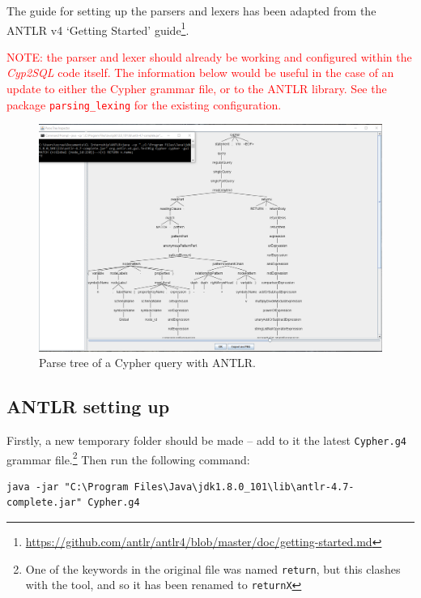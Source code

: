 \documentclass[letterpaper]{ltxdoc}
\begin{document}
The guide for setting up the parsers and lexers has been adapted from the ANTLR v4 `Getting Started' guide\footnote{\url{https://github.com/antlr/antlr4/blob/master/doc/getting-started.md}}.

\medskip

\textcolor{red}{NOTE: the parser and lexer should already be working and configured within the \emph{Cyp2SQL} code itself. The information below would be useful in the case of an update to either the Cypher grammar file, or to the ANTLR library. See the package \texttt{parsing\_lexing} for the existing configuration.}

\begin{figure}[h]
\centerline{\includegraphics[width=\textwidth,height=\textheight,keepaspectratio]{ss3.png}}
\caption{Parse tree of a Cypher query with ANTLR.}
\label{antlrs}
\end{figure}

\subsection{ANTLR setting up}

Firstly, a new temporary folder should be made -- add to it the latest \texttt{Cypher.g4} grammar file.\footnote{One of the keywords in the original file was named \texttt{return}, but this clashes with the tool, and so it has been renamed to \texttt{returnX}} Then run the following command:

\begin{lstlisting}[style=DOS]
java -jar "C:\Program Files\Java\jdk1.8.0_101\lib\antlr-4.7-complete.jar" Cypher.g4
\end{lstlisting}
\end{document}
